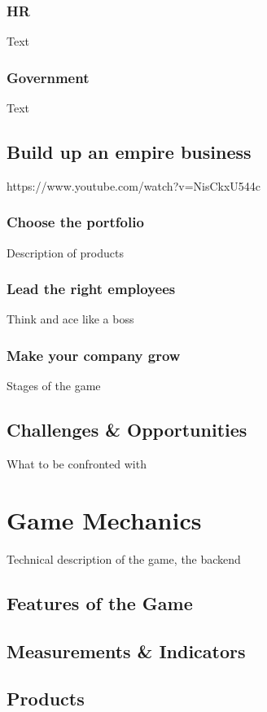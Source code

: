 \documentclass[11pt,titlepage,oneside,openany]{book}
\begin{document}
\subsection{HR}
Text
\subsection{Government}
Text

\section{Build up an empire business}
\label{sec:good}
https://www.youtube.com/watch?v=NisCkxU544c
\subsection{Choose the portfolio}

Description of products

\subsection{Lead the right employees}

Think and ace like a boss

\subsection{Make your company grow}
Stages of the game


\section{Challenges \& Opportunities}
\label{sec:evil}


What to be confronted with 
\chapter{Game Mechanics}
\label{cha:alg}
Technical description of the game, the backend
\section{Features of the Game}
\label{sec:comp-good}

\section{Measurements \& Indicators}
\label{sec:diag}

\section{Products}
\label{sec:diag}
\end{document}
